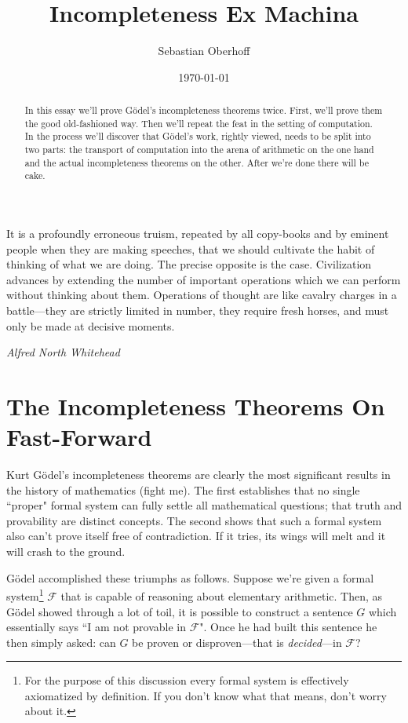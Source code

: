 \documentclass{article}
\theoremstyle{theorem}
\begin{document}
\title{\vspace{-2.0cm}Incompleteness Ex Machina}
\author{Sebastian Oberhoff\\\scalebox{0.8}{oberhoff.sebastian@gmail.com}}
\date{\today\\\scalebox{0.8}{(originally published December 31, 2018)}}

\maketitle

\begin{abstract}
In this essay we'll prove Gödel's incompleteness theorems twice. First, we'll prove them the good old-fashioned way. Then we'll repeat the feat in the setting of computation. In the process we'll discover that Gödel's work, rightly viewed, needs to be split into two parts: the transport of computation into the arena of arithmetic on the one hand and the actual incompleteness theorems on the other. After we're done there will be cake.
\end{abstract}

\setlength{\epigraphwidth}{\textwidth}

\epigraph{It is a profoundly erroneous truism, repeated by all copy-books and by eminent people when they are making speeches, that we should cultivate the habit of thinking of what we are doing. The precise opposite is the case. Civilization advances by extending the number of important operations which we can perform without thinking about them. Operations of thought are like cavalry charges in a battle---they are strictly limited in number, they require fresh horses, and must only be made at decisive moments. }{\textit{Alfred North Whitehead}}

\section{The Incompleteness Theorems On Fast-Forward}

Kurt Gödel's incompleteness theorems are clearly the most significant results in the history of mathematics (fight me). The first establishes that no single ``proper" formal system can fully settle all mathematical questions; that truth and provability are distinct concepts. The second shows that such a formal system also can't prove itself free of contradiction. If it tries, its wings will melt and it will crash to the ground.

Gödel accomplished these triumphs as follows. Suppose we're given a formal system\footnote{For the purpose of this discussion every formal system is effectively axiomatized by definition. If you don't know what that means, don't worry about it.} $\mathcal{F}$ that is capable of reasoning about elementary arithmetic. Then, as Gödel showed through a lot of toil, it is possible to construct a sentence $G$ which essentially says ``I am not provable in $\mathcal{F}$". Once he had built this sentence he then simply asked: can $G$ be proven or disproven---that is \textit{decided}---in $\mathcal{F}$?
\end{document}
